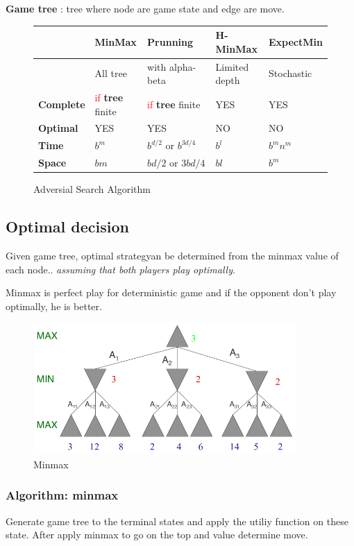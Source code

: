 \textbf{Game tree} : tree where node are game state and edge are move.

\begin{figure}[h]
\centering
\begin{tabular}{|l|m{3cm}|m{3cm}|m{3cm}|m{3cm}|}
\hline
& \textbf{MinMax} & \textbf{Prunning} & \textbf{H-MinMax} & \textbf{ExpectMin} \\
\hline
& All tree & with alpha-beta & Limited depth & Stochastic \\

\hline
\hline
\textbf{Complete} & \textcolor{red}{if} \textbf{tree} finite & \textcolor{red}{if} \textbf{tree} finite  & YES  & YES \\
\hline
\textbf{Optimal} & YES & YES & NO & NO \\
\hline
\textbf{Time} & $b^{m}$    & $b^{d/2}\textrm{ or }b^{3d/4}$ & $b^l$ & $b^m n^m$\\
\hline
\textbf{Space} & $bm$ & $bd/2\textrm{ or }3bd/4$ & $bl$ & $b^m$ \\
\hline

\end{tabular}
\caption{Adversial Search Algorithm}
\end{figure}



\subsection{Optimal decision}
Given game tree, optimal strategyan be determined from the minmax value of each
node.. \textit{assuming that both players play optimally}.

Minmax is perfect play for deterministic game and if the opponent don't play
optimally, he is better.

\begin{figure}[h]
    \centering
    \includegraphics[width=10cm]{minmax.png}
    \caption{Minmax}
\end{figure}

\subsubsection{Algorithm: minmax}
Generate game tree to the terminal states and apply the utiliy function on these state.
After apply minmax to go on the top and value determine move.

